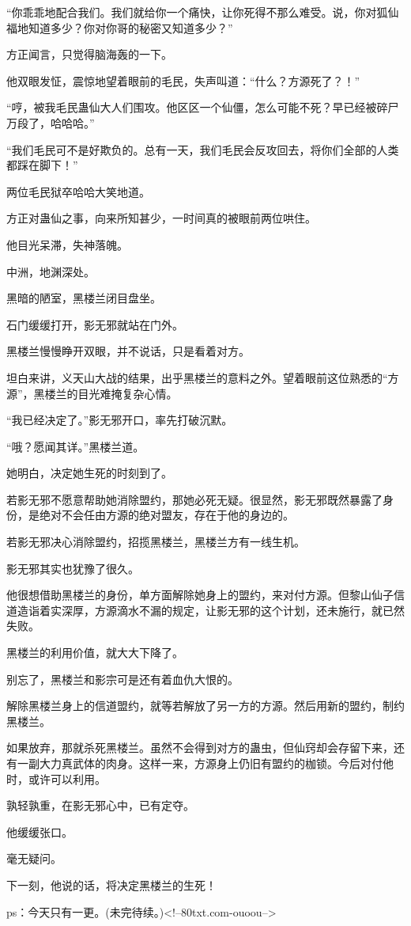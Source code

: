 \begin{this_body}
“你乖乖地配合我们。我们就给你一个痛快，让你死得不那么难受。说，你对狐仙福地知道多少？你对你哥的秘密又知道多少？”

方正闻言，只觉得脑海轰的一下。

他双眼发怔，震惊地望着眼前的毛民，失声叫道：“什么？方源死了？！”

“哼，被我毛民蛊仙大人们围攻。他区区一个仙僵，怎么可能不死？早已经被碎尸万段了，哈哈哈。”

“我们毛民可不是好欺负的。总有一天，我们毛民会反攻回去，将你们全部的人类都踩在脚下！”

两位毛民狱卒哈哈大笑地道。

方正对蛊仙之事，向来所知甚少，一时间真的被眼前两位哄住。

他目光呆滞，失神落魄。

中洲，地渊深处。

黑暗的陋室，黑楼兰闭目盘坐。

石门缓缓打开，影无邪就站在门外。

黑楼兰慢慢睁开双眼，并不说话，只是看着对方。

坦白来讲，义天山大战的结果，出乎黑楼兰的意料之外。望着眼前这位熟悉的“方源”，黑楼兰的目光难掩复杂心情。

“我已经决定了。”影无邪开口，率先打破沉默。

“哦？愿闻其详。”黑楼兰道。

她明白，决定她生死的时刻到了。

若影无邪不愿意帮助她消除盟约，那她必死无疑。很显然，影无邪既然暴露了身份，是绝对不会任由方源的绝对盟友，存在于他的身边的。

若影无邪决心消除盟约，招揽黑楼兰，黑楼兰方有一线生机。

影无邪其实也犹豫了很久。

他很想借助黑楼兰的身份，单方面解除她身上的盟约，来对付方源。但黎山仙子信道造诣着实深厚，方源滴水不漏的规定，让影无邪的这个计划，还未施行，就已然失败。

黑楼兰的利用价值，就大大下降了。

别忘了，黑楼兰和影宗可是还有着血仇大恨的。

解除黑楼兰身上的信道盟约，就等若解放了另一方的方源。然后用新的盟约，制约黑楼兰。

如果放弃，那就杀死黑楼兰。虽然不会得到对方的蛊虫，但仙窍却会存留下来，还有一副大力真武体的肉身。这样一来，方源身上仍旧有盟约的枷锁。今后对付他时，或许可以利用。

孰轻孰重，在影无邪心中，已有定夺。

他缓缓张口。

毫无疑问。

下一刻，他说的话，将决定黑楼兰的生死！

ps：今天只有一更。(未完待续。)<!--80txt.com-ouoou-->

\end{this_body}

